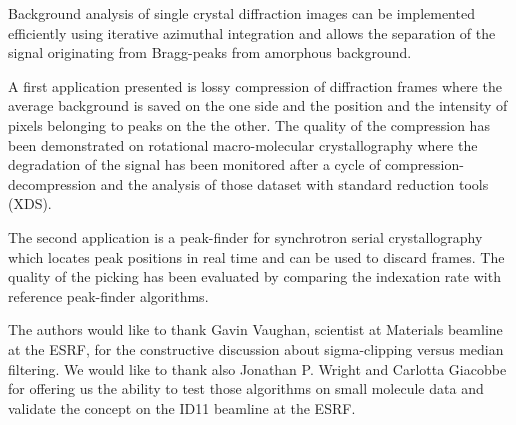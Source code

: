 \documentclass[preprint]{iucr}              %
\begin{document}
Background analysis of single crystal diffraction images can be implemented efficiently using iterative azimuthal integration and allows the separation of the signal originating from Bragg-peaks from amorphous background.

A first application presented is lossy compression of diffraction frames where the average background is saved on the one side and the position and the intensity of pixels belonging to peaks on the the other.
The quality of the compression has been demonstrated on rotational macro-molecular crystallography where the degradation of the signal has been monitored after a cycle of compression-decompression and the analysis of those dataset with standard reduction tools (XDS).

The second application is a peak-finder for synchrotron serial crystallography which locates peak positions in real time and can be used to discard frames. 
The quality of the picking has been evaluated by comparing the indexation rate with reference peak-finder algorithms.



The authors would like to thank Gavin Vaughan, scientist at Materials beamline at the ESRF,  for the constructive discussion about sigma-clipping versus median filtering. 
We would like to thank also Jonathan P. Wright and Carlotta Giacobbe for offering us the ability to test those algorithms on small molecule data and validate the concept on the ID11 beamline at the ESRF.




\end{document}
